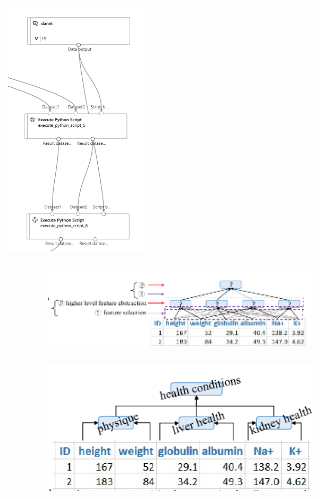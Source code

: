 \begin{figure}[H]
    \begin{subfigure}[m]{0.49\textwidth}
        \centering
        \includegraphics[width=0.4\textwidth]{images/danet}
        \label{fig:danet-pipe}
    \end{subfigure}
    \hfill
    \begin{subfigure}[m]{0.49\textwidth}
        \begin{subfigure}[m]{\textwidth}
            \centering
            \includegraphics[width=\textwidth]{images/danet_1}
        \end{subfigure}
        \begin{subfigure}[m]{\textwidth}
            \centering
            \includegraphics[width=\textwidth]{images/danet_2}
        \end{subfigure}
        \label{fig:danet-abst}
    \end{subfigure}
\end{figure}




